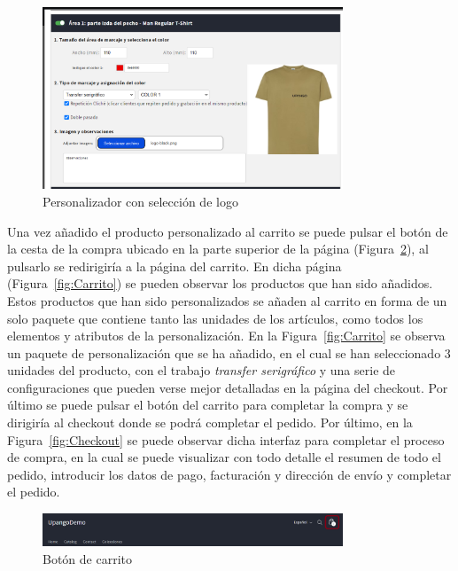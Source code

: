 \documentclass[11pt]{article}
\begin{document}
\begin{figure}[H]
    \centering
    \includegraphics[width=0.8\textwidth]{imagenes/ManualUsuario/PersonalizadorLogoSeleccionado.png}
    \caption{\label{fig:PersonalizadorLogo}Personalizador con selección de logo}
    \vspace{\fill}
\end{figure}


Una vez añadido el producto personalizado al carrito se puede pulsar el botón de la cesta de la compra ubicado en la parte superior de la página (Figura~\ref{fig:BotonCarrito}), al pulsarlo se redirigiría a la página del carrito.
En dicha página (Figura~\ref{fig:Carrito}) se pueden observar los productos que han sido añadidos. Estos productos que han sido personalizados se añaden al carrito en forma de un solo paquete que contiene
tanto las unidades de los artículos, como todos los elementos y atributos de la personalización.
En la Figura~\ref{fig:Carrito} se observa un paquete de personalización que se ha añadido, en el cual se han seleccionado 3 unidades del producto, con el trabajo \textit{transfer serigráfico} y una serie de configuraciones 
que pueden verse mejor detalladas en la página del checkout. Por último se puede pulsar el botón del carrito para completar la compra y se dirigiría al checkout donde se podrá completar el pedido.
Por último, en la Figura~\ref{fig:Checkout} se puede observar dicha interfaz para completar el proceso de compra, en la cual se puede visualizar con todo detalle el resumen de todo el pedido, introducir los datos de pago, facturación y dirección de envío
y completar el pedido.


\begin{figure}[H]
    \centering
    \includegraphics[width=0.8\textwidth]{imagenes/ManualUsuario/BotonCarrito.png}
    \caption{\label{fig:BotonCarrito}Botón de carrito}
    \vspace{\fill}
\end{figure}
\end{document}
